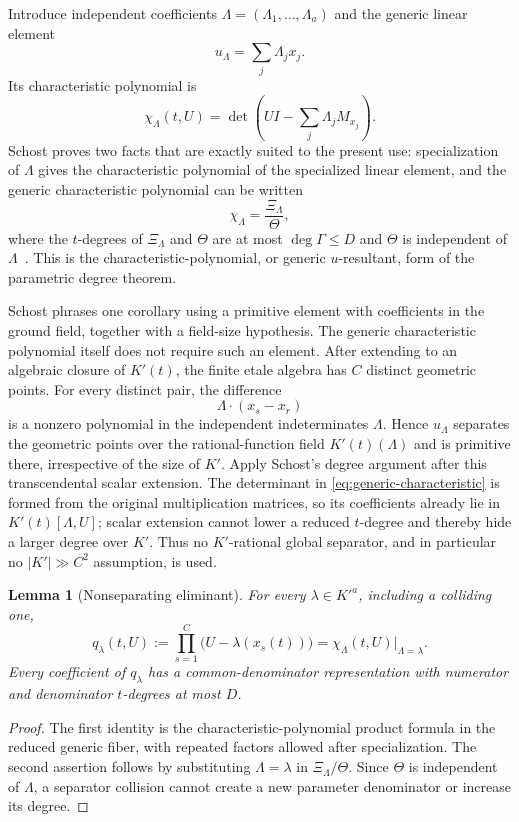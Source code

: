 \documentclass[11pt]{article}
\newtheorem{lemma}[theorem]{Lemma}
\theoremstyle{definition}
\begin{document}
Introduce independent coefficients $\Lambda=(\Lambda_1,\ldots,\Lambda_a)$ and the generic linear element
\[
 u_\Lambda=\sum_j\Lambda_jx_j.
\]
Its characteristic polynomial is
\begin{equation}\label{eq:generic-characteristic}
 \chi_\Lambda(t,U)
 =\det\!\left(UI-\sum_j\Lambda_jM_{x_j}\right).
\end{equation}
Schost proves two facts that are exactly suited to the present use: specialization of $\Lambda$ gives the characteristic polynomial of the specialized linear element, and the generic characteristic polynomial can be written
\[
 \chi_\Lambda=\frac{\Xi_\Lambda}{\Theta},
\]
where the $t$-degrees of $\Xi_\Lambda$ and $\Theta$ are at most $\deg\Gamma\le D$ and $\Theta$ is independent of $\Lambda$~\cite[Lemmas~2--3 and Proposition~2]{Schost2003}.  This is the characteristic-polynomial, or generic $u$-resultant, form of the parametric degree theorem.

Schost phrases one corollary using a primitive element with coefficients in the ground field, together with a field-size hypothesis.  The generic characteristic polynomial itself does not require such an element.  After extending to an algebraic closure of $K'(t)$, the finite etale algebra has $C$ distinct geometric points.  For every distinct pair, the difference
\[
 \Lambda\cdot(x_s-x_r)
\]
is a nonzero polynomial in the independent indeterminates $\Lambda$.  Hence $u_\Lambda$ separates the geometric points over the rational-function field $K'(t)(\Lambda)$ and is primitive there, irrespective of the size of $K'$.  Apply Schost's degree argument after this transcendental scalar extension.  The determinant in \eqref{eq:generic-characteristic} is formed from the original multiplication matrices, so its coefficients already lie in $K'(t)[\Lambda,U]$; scalar extension cannot lower a reduced $t$-degree and thereby hide a larger degree over $K'$.  Thus no $K'$-rational global separator, and in particular no $|K'|\gg C^2$ assumption, is used.

\begin{lemma}[Nonseparating eliminant]\label{lem:charpoly}
For every $\lambda\in K'^a$, including a colliding one,
\[
 q_\lambda(t,U)
 :=\prod_{s=1}^{C}\bigl(U-\lambda(x_s(t))\bigr)
 =\chi_\Lambda(t,U)\big|_{\Lambda=\lambda}.
\]
Every coefficient of $q_\lambda$ has a common-denominator representation with numerator and denominator $t$-degrees at most $D$.
\end{lemma}

\begin{proof}
The first identity is the characteristic-polynomial product formula in the reduced generic fiber, with repeated factors allowed after specialization.  The second assertion follows by substituting $\Lambda=\lambda$ in $\Xi_\Lambda/\Theta$.  Since $\Theta$ is independent of $\Lambda$, a separator collision cannot create a new parameter denominator or increase its degree.
\end{proof}
\end{document}
